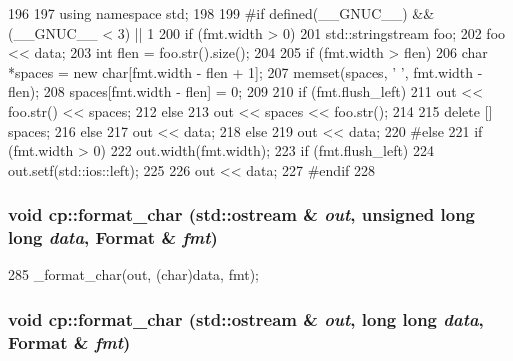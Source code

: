 \begin{DoxyCode}
196 {
197     using namespace std;
198 
199 #if defined(__GNUC__) && (__GNUC__ < 3) || 1
200     if (fmt.width > 0) {
201         std::stringstream foo;
202         foo << data;
203         int flen = foo.str().size();
204 
205         if (fmt.width > flen) {
206             char *spaces = new char[fmt.width - flen + 1];
207             memset(spaces, ' ', fmt.width - flen);
208             spaces[fmt.width - flen] = 0;
209 
210             if (fmt.flush_left)
211                 out << foo.str() << spaces;
212             else
213                 out << spaces << foo.str();
214 
215             delete [] spaces;
216         } else
217             out << data;
218     } else
219         out << data;
220 #else
221     if (fmt.width > 0)
222         out.width(fmt.width);
223     if (fmt.flush_left)
224         out.setf(std::ios::left);
225 
226     out << data;
227 #endif
228 }
\end{DoxyCode}
\hypertarget{namespacecp_ae70d3faeee016080d264d2693275f008}{
\subsubsection[{format\_\-char}]{\setlength{\rightskip}{0pt plus 5cm}void cp::format\_\-char (std::ostream \& {\em out}, \/  unsigned long long {\em data}, \/  Format \& {\em fmt})}}
\label{namespacecp_ae70d3faeee016080d264d2693275f008}



\begin{DoxyCode}
285 { _format_char(out, (char)data, fmt); }
\end{DoxyCode}
\hypertarget{namespacecp_a7511f1c332986a17854f42421d4362c5}{
\subsubsection[{format\_\-char}]{\setlength{\rightskip}{0pt plus 5cm}void cp::format\_\-char (std::ostream \& {\em out}, \/  long long {\em data}, \/  Format \& {\em fmt})}}
\label{namespacecp_a7511f1c332986a17854f42421d4362c5}



